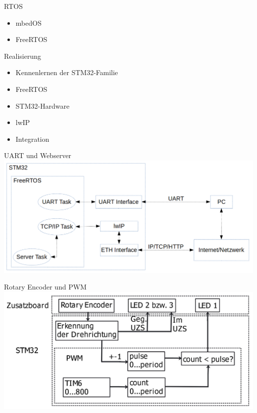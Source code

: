 \documentclass[17pt]{beamer}
\begin{document}
\begin{frame}[t]{RTOS}
  \vspace{2cm}
  \begin{itemize}
    \item mbedOS
    \item FreeRTOS
  \end{itemize}
\end{frame}

\begin{frame}[t]{Realisierung}
  \vspace{10pt}
  \begin{itemize}
    \item Kennenlernen der STM32-Familie
    \item FreeRTOS
    \item STM32-Hardware
    \item lwIP
    \item Integration
  \end{itemize}
\end{frame}

\begin{frame}[t]{UART und Webserver}
    \centering
    \vspace{0.1\textheight}
    \includegraphics[width=\textwidth]{images/webserver_block}
\end{frame}

\begin{frame}[t]{Rotary Encoder und PWM}
  \centering
  \vspace{0.1\textheight}
  \includegraphics[width=\textwidth]{images/rotary_block}
\end{frame}
\end{document}
